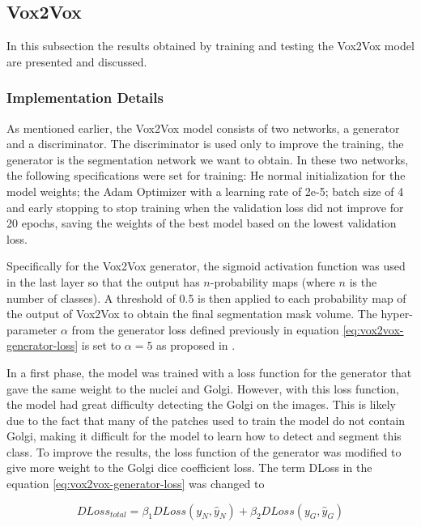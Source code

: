 \subsection{Vox2Vox}

In this subsection the results obtained by training and testing the Vox2Vox model are presented and discussed.

\subsubsection*{Implementation Details}

As mentioned earlier, the Vox2Vox model consists of two networks, a generator and a discriminator. The discriminator is used only to improve the training, the generator is the segmentation network we want to obtain. In these two networks, the following specifications were set for training: He normal initialization for the model weights; the Adam Optimizer with a learning rate of 2e-5; batch size of 4 and early stopping to stop training when the validation loss did not improve for 20 epochs, saving the weights of the best model based on the lowest validation loss.

Specifically for the Vox2Vox generator, the sigmoid activation function was used in the last layer so that the output has $n$-probability maps (where $n$ is the number of classes). A threshold of 0.5 is then applied to each probability map of the output of Vox2Vox to obtain the final segmentation mask volume. The hyper-parameter $\alpha$ from the generator loss defined previously in equation \ref{eq:vox2vox-generator-loss} is set to $\alpha = 5$ as proposed in \cite{vox2vox}.

In a first phase, the model was trained with a loss function for the generator that gave the same weight to the nuclei and Golgi. However, with this loss function, the model had great difficulty detecting the Golgi on the images. This is likely due to the fact that many of the patches used to train the model do not contain Golgi, making it difficult for the model to learn how to detect and segment this class. To improve the results, the loss function of the generator was modified to give more weight to the Golgi dice coefficient loss. The term \ac{DLoss} in the equation \ref{eq:vox2vox-generator-loss} was changed to

\begin{equation}
    DLoss_{total} = \beta_1 DLoss(y_N,\hat{y}_N) + \beta_2 DLoss(y_G,\hat{y}_G)
\end{equation}

